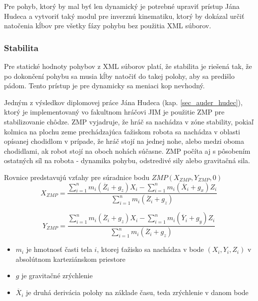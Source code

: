 Pre pohyb, ktorý by mal byť len dynamický je potrebné upraviť prístup Jána Hudeca a vytvoriť taký modul pre inverznú kinematiku, ktorý by dokázal určiť natočenia kĺbov pre všetky fázy pohybu bez použitia XML súborov.
 
\subsubsection{Stabilita}
Pre statické hodnoty pohybov z XML súborov platí, že stabilita je riešená tak, že po dokončení pohybu sa musia kĺby natočiť do takej polohy, aby sa predišlo pádom. Tento prístup je pre dynamicky sa meniaci kop nevhodný.

Jedným z výsledkov diplomovej práce Jána Hudeca\cite{hudec} (kap. \ref{sec_auder_hudec}), ktorý je implementovaný vo fakultnom hráčovi JIM je použitie ZMP pre stabilizovanie chôdze.  
ZMP vyjadruje, že hráč sa nachádza v zóne stability, pokiaľ kolmica na plochu zeme prechádzajúca ťažiskom robota sa nachádza v oblasti opísanej chodidlom v prípade, že hráč stojí na jednej nohe, alebo medzi oboma chodidlami, ak robot stojí na oboch nohách súčasne. ZMP počíta aj s pôsobením ostatných síl na robota - dynamika pohybu, odstredivé sily alebo gravitačná sila.

Rovnice predstavujú vzťahy pre súradnice bodu $ZMP(X_{ZMP}, Y_{ZMP}, 0)$
\begin{equation}
	X_{ZMP} = \frac{\sum_{i=1}^{n}{m_i(\ddot{Z_i} + g_z)X_i - \sum_{i=1}^{n}{m_i(\ddot{X_i} + g_x)Z_i}}}
	{\sum_{i=1}^{n}{m_i(\ddot{Z_i} + g_z)}}
\end{equation}

\begin{equation}
	Y_{ZMP} = \frac{\sum_{i=1}^{n}{m_i(\ddot{Z_i} + g_z)X_i - \sum_{i=1}^{n}{m_i(\ddot{Y_i} + g_y)Z_i}}}
	{\sum_{i=1}^{n}{m_i(\ddot{Z_i} + g_z)}}
\end{equation}

\begin{itemize}
	\item $m_i$ je hmotnosť časti tela $i$, ktorej ťažisko sa nachádza v bode $(X_i, Y_i, Z_i)$ v absolútnom karteziánskom priestore
	\item $g$ je gravitačné zrýchlenie
	\item $\ddot{X_i}$ je druhá derivácia polohy na základe času, teda zrýchlenie v danom bode
\end{itemize}

